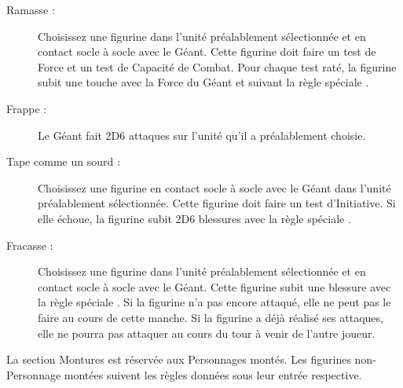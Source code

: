 {{\begin{description}
			\item[Ramasse :] Choisissez une figurine dans l'unité préalablement sélectionnée et en contact socle à socle avec le Géant. Cette figurine doit faire un test de Force et un test de Capacité de Combat. Pour chaque test raté, la figurine subit une touche avec la Force du Géant et suivant la règle spéciale .
			\item[Frappe :] Le Géant fait 2D6 attaques sur l'unité qu'il a préalablement choisie.
			\item [Tape comme un sourd :] Choisissez une figurine en contact socle à socle avec le Géant dans l'unité préalablement sélectionnée. Cette figurine doit faire un test d'Initiative. Si elle échoue, la figurine subit 2D6 blessures avec la règle spéciale .
			\item[Fracasse :] Choisissez une figurine dans l'unité préalablement sélectionnée et en contact socle à socle avec le Géant. Cette figurine subit une blessure avec la règle spéciale . Si la figurine n'a pas encore attaqué, elle ne peut pas le faire au cours de cette manche. Si la figurine a déjà réalisé ses attaques, elle ne pourra pas attaquer au cours du tour à venir de l'autre joueur.
		\end{description}
	}
}

\mountstitle

La section Montures est réservée aux Personnages montés. Les figurines non-Personnage montées suivent les règles données sous leur entrée respective.



